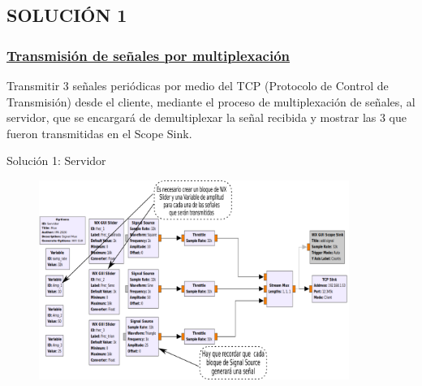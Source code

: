 \subsection{SOLUCIÓN 1}

\begin{frame}
	
	
	\frametitle{\underline{\textbf{Transmisión de señales por multiplexación}}}
	
	Transmitir 3 señales periódicas por medio del TCP (Protocolo de 	Control de Transmisión) desde el cliente, mediante el proceso de multiplexación de señales, al 	servidor, que se encargará de demultiplexar la señal recibida y mostrar las 3 que fueron  	transmitidas en el Scope Sink.\vspace{2mm}
	
	
\end{frame}


\begin{frame}{Solución 1: Servidor}
\begin{figure}[H]
	\vspace{-3mm}
	\centering
	\includegraphics[width=0.9\textwidth]{soluciones/actividad-1-1/pdf/Actividad1_1.pdf}
\end{figure}
\end{frame}

